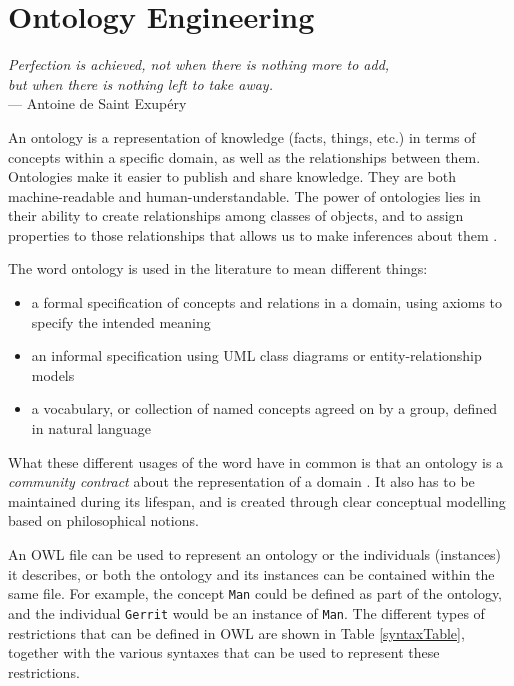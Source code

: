 \chapter{Ontology Engineering}
\label{OntologyEngineering}

\begin{flushright}{\slshape    
Perfection is achieved, not when there is nothing more to add, \\
but when there is nothing left to take away.} \\ \medskip
    ---  Antoine de Saint Exup\'ery
\end{flushright}

An ontology is a representation of knowledge (facts, things, etc.) in terms of concepts within a specific domain, as well as the relationships between them. Ontologies make it easier to publish and share knowledge. They are both machine-readable and human-understandable. The power of ontologies lies in their ability to create relationships among classes of objects, and to assign properties to those relationships that allows us to make inferences about them \cite{Jepsen2009}.

The word ontology is used in the literature to mean different things:
\begin{itemize}
	\item a formal specification of concepts and relations in a domain, using axioms to specify the intended meaning
	\item an informal specification using UML class diagrams or entity-relationship models
	\item a vocabulary, or collection of named concepts agreed on by a group, defined in natural language
\end{itemize}

What these different usages of the word have in common is that an ontology is a \emph{community contract}\label{CommunityContract} about the representation of a domain \cite{Hepp2007}. It also has to be maintained during its lifespan, and is created through clear conceptual modelling based on philosophical notions. 

An \ac{OWL} file can be used to represent an ontology or the individuals (instances) it describes, or both the ontology and its instances can be contained within the same file. For example, the concept \texttt{Man} could be defined as part of the ontology, and the individual \texttt{Gerrit} would be an instance of \texttt{Man}. The different types of restrictions that can be defined in \ac{OWL} are shown in Table \ref{syntaxTable}, together with the various syntaxes that can be used to represent these restrictions.

